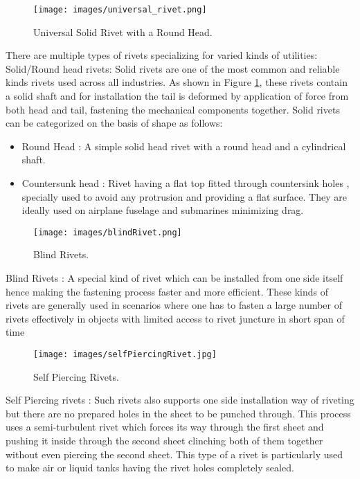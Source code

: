 \documentclass{article}
\begin{document}
\begin{figure}[H]
    \centering
    \texttt{[image: images/universal\_rivet.png]}
    \caption{Universal Solid Rivet with a Round Head.}
    \label{fig: SolidRoundHeadRivet}
\end{figure}

There are multiple types of rivets specializing for varied kinds of utilities:\\

Solid/Round head rivets: Solid rivets are one of the most common and reliable kinds rivets used across all industries. As shown in Figure \ref{fig: SolidRoundHeadRivet}, these rivets contain a solid shaft and for installation the tail is deformed by application of force from both head and tail, fastening the mechanical components together. Solid rivets can be categorized on the basis of shape as follows:

    
    \begin{itemize}
        \item Round Head : A simple solid head rivet with a round head and a cylindrical shaft.
        \item Countersunk head : Rivet having a flat top fitted through countersink holes , specially used to avoid any protrusion and providing a flat surface. They are ideally used on airplane fuselage and submarines minimizing drag.
    \end{itemize}
   
   
\begin{figure}[H]
    \centering
    \texttt{[image: images/blindRivet.png]}
    \caption{Blind Rivets.}
    \label{fig: blindRivet}
\end{figure}

Blind Rivets : A special kind of rivet which can be installed from one side itself hence making the fastening process faster and more efficient. These kinds of rivets are generally used in scenarios where one has to fasten a large number of rivets effectively in objects with limited access to rivet juncture in short span of time

\begin{figure}[htp]
    \centering
    \texttt{[image: images/selfPiercingRivet.jpg]}
    \caption{Self Piercing Rivets.}
    \label{fig: blindRivet}
\end{figure}

Self Piercing rivets : Such rivets also supports one side installation way of riveting but there are no prepared holes in the sheet to be punched through. This process uses a semi-turbulent rivet which forces its way through the first sheet and pushing it inside through the second sheet clinching both of them together without even piercing the second sheet. This type of a rivet is particularly used to make air or liquid tanks having the rivet holes completely sealed.  
\end{document}
